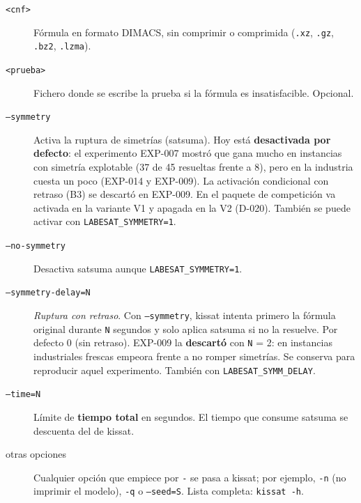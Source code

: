 \documentclass[11pt,a4paper]{article}
\begin{document}
\begin{description}
  \item[\texttt{<cnf>}] Fórmula en formato DIMACS, sin comprimir o comprimida
        (\texttt{.xz}, \texttt{.gz}, \texttt{.bz2}, \texttt{.lzma}).
  \item[\texttt{<prueba>}] Fichero donde se escribe la prueba si la fórmula es
        insatisfacible. Opcional.
  \item[\texttt{--symmetry}] Activa la ruptura de simetrías (satsuma). Hoy está
        \textbf{desactivada por defecto}: el experimento EXP-007 mostró que gana
        mucho en instancias con simetría explotable (37 de 45 resueltas frente a
        8), pero en la industria cuesta un poco (EXP-014 y EXP-009). La
        activación condicional con retraso (B3) se descartó en EXP-009. En el paquete de competición va
        activada en la variante V1 y apagada en la V2 (D-020). También se puede activar con \texttt{LABESAT\_SYMMETRY=1}.
  \item[\texttt{--no-symmetry}] Desactiva satsuma aunque \texttt{LABESAT\_SYMMETRY=1}.
  \item[\texttt{--symmetry-delay=N}] \emph{Ruptura con retraso}. Con
        \texttt{--symmetry}, kissat intenta primero la fórmula original
        durante \texttt{N} segundos y solo aplica satsuma si no la resuelve.
        Por defecto 0 (sin retraso). EXP-009 la \textbf{descartó} con
        \texttt{N} = 2: en instancias industriales frescas empeora frente a
        no romper simetrías. Se conserva para reproducir aquel experimento.
        También con \texttt{LABESAT\_SYMM\_DELAY}.
  \item[\texttt{--time=N}] Límite de \textbf{tiempo total} en segundos. El
        tiempo que consume satsuma se descuenta del de kissat.
  \item[otras opciones] Cualquier opción que empiece por \texttt{-} se pasa a
        kissat; por ejemplo, \texttt{-n} (no imprimir el modelo),
        \texttt{-q} o \texttt{--seed=S}. Lista completa: \texttt{kissat -h}.
\end{description}
\end{document}
